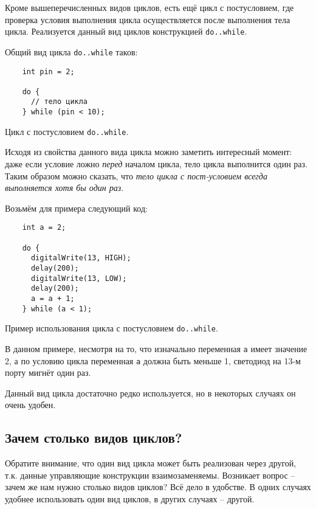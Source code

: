 \documentclass[../sparc.tex]{subfiles}
\begin{document}
Кроме вышеперечисленных видов циклов, есть ещё цикл с постусловием, где
проверка условия выполнения цикла осуществляется после выполнения тела цикла.
Реализуется данный вид циклов конструкцией \texttt{do..while}.

Общий вид цикла \texttt{do..while} таков:

\begin{listing}[ht]
  \begin{verbatim}
    int pin = 2;

    do {
      // тело цикла
    } while (pin < 10);
  \end{verbatim}
  \label{listing:dialogues-with-computer-do-while}
  \caption{Цикл с постусловием \texttt{do..while}.}
\end{listing}

Исходя из свойства данного вида цикла можно заметить интересный момент: даже
если условие ложно \emph{перед} началом цикла, тело цикла выполнится один раз.
Таким образом можно сказать, что \emph{тело цикла с пост-условием всегда
выполняется хотя бы один раз}.

Возьмём для примера следующий код:

\begin{listing}[ht]
  \begin{verbatim}
    int a = 2;

    do {
      digitalWrite(13, HIGH);
      delay(200);
      digitalWrite(13, LOW);
      delay(200);
      a = a + 1;
    } while (a < 1);
  \end{verbatim}
  \label{listing:dialogues-with-computer-do-while-example}
  \caption{Пример использования цикла с постусловием \texttt{do..while}.}
\end{listing}

В данном примере, несмотря на то, что изначально переменная \texttt{a} имеет
значение 2, а по условию цикла переменная \texttt{a} должна быть меньше 1,
светодиод на 13-м порту мигнёт один раз.

Данный вид цикла достаточно редко используется, но в некоторых случаях он очень
удобен.

\subsection{Зачем столько видов циклов?}

Обратите внимание, что один вид цикла может быть реализован через другой, т.к.
данные управляющие конструкции взаимозаменяемы. Возникает вопрос -- зачем же нам
нужно столько видов циклов? Всё дело в удобстве. В одних случаях удобнее
использовать один вид циклов, в других случаях -- другой.
\end{document}

